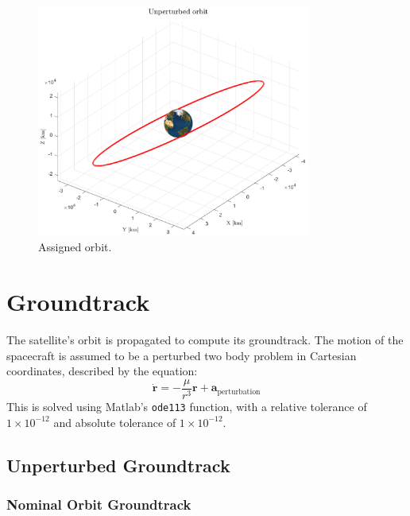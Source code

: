 \documentclass{article}
\begin{document}
\begin{figure}[H]
	\centering
	\includegraphics[width=0.8\textwidth]{nominal_orbit.eps}
	\caption{Assigned orbit.}
	\label{fig:nominal_orbit}
\end{figure}

\section{Groundtrack}
The satellite's orbit is propagated to compute its groundtrack. The motion of the spacecraft is assumed to be a perturbed two body problem in Cartesian coordinates, described by the equation:
\[
\dot{\mathbf{r}} = -\frac{\mu}{r^3} \mathbf{r} + \mathbf{a}_{\text{perturbation}}
\]
This is solved using Matlab's \texttt{ode113} function, with a relative tolerance of \(1 \times 10^{-12}\) and absolute tolerance of \(1 \times 10^{-12}\).


\subsection{Unperturbed Groundtrack}
\subsubsection{Nominal Orbit Groundtrack}
\end{document}
